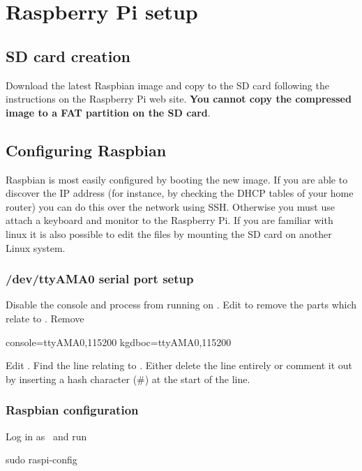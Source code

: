 \chapter{Raspberry Pi setup}

\section{SD card creation}

Download the latest Raspbian image and copy to the SD card following
the instructions on the Raspberry Pi web site. \textbf{You cannot copy
  the compressed image to a FAT partition on the SD card}.

\section{Configuring Raspbian}

Raspbian is most easily configured by booting the new image. If you
are able to discover the IP address (for instance, by checking the
DHCP tables of your home router) you can do this over the network
using SSH. Otherwise you must use attach a keyboard and monitor to the
Raspberry Pi. If you are familiar with linux it is also possible to
edit the files by mounting the SD card on another Linux system.

\subsection{/dev/ttyAMA0 serial port setup}

Disable the console and  process from running on
. Edit  to remove
the parts which relate to . Remove
\begin{Cmd}
console=ttyAMA0,115200 kgdboc=ttyAMA0,115200
\end{Cmd}


Edit . Find the line relating to
. Either delete the line entirely or comment it out
by inserting a hash character (\#) at the start of the line.

\subsection{Raspbian configuration}

Log in as \piUser\ and run
\begin{Cmd}
sudo raspi-config
\end{Cmd}


